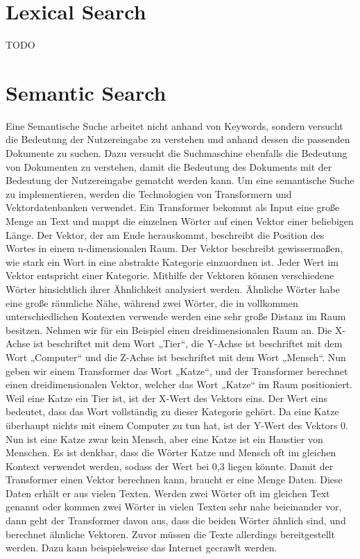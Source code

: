 \section{Lexical Search}
TODO

\section{Semantic Search}
Eine Semantische Suche arbeitet nicht anhand von Keywords, sondern versucht die Bedeutung der Nutzereingabe zu verstehen und anhand dessen die passenden Dokumente zu suchen. Dazu versucht die Suchmaschine ebenfalls die Bedeutung von Dokumenten zu verstehen, damit die Bedeutung des Dokuments mit der Bedeutung der Nutzereingabe gematcht werden kann.
Um eine semantische Suche zu implementieren, werden die Technologien von Transformern und Vektordatenbanken verwendet. Ein Transformer bekommt als Input eine große Menge an Text und mappt die einzelnen Wörter auf einen Vektor einer beliebigen Länge. Der Vektor, der am Ende herauskommt, beschreibt die Position des Wortes in einem n-dimensionalen Raum. Der Vektor beschreibt gewissermaßen, wie stark ein Wort in eine abstrakte Kategorie einzuordnen ist. Jeder Wert im Vektor entspricht einer Kategorie. Mithilfe der Vektoren können verschiedene Wörter hinsichtlich ihrer Ähnlichkeit analysiert werden. Ähnliche Wörter habe eine große räumliche Nähe, während zwei Wörter, die in vollkommen unterschiedlichen Kontexten verwende werden eine sehr große Distanz im Raum besitzen.
Nehmen wir für ein Beispiel einen dreidimensionalen Raum an. Die X-Achse ist beschriftet mit dem Wort „Tier“, die Y-Achse ist beschriftet mit dem Wort „Computer“ und die Z-Achse ist beschriftet mit dem Wort „Mensch“. Nun geben wir einem Transformer das Wort „Katze“, und der Transformer berechnet einen dreidimensionalen Vektor, welcher das Wort „Katze“ im Raum positioniert. Weil eine Katze ein Tier ist, ist der X-Wert des Vektors eins.  Der Wert eins bedeutet, dass das Wort vollständig zu dieser Kategorie gehört. Da eine Katze überhaupt nichts mit einem Computer zu tun hat, ist der Y-Wert des Vektors 0. Nun ist eine Katze zwar kein Mensch, aber eine Katze ist ein Haustier von Menschen. Es ist denkbar, dass die Wörter Katze und Mensch oft im gleichen Kontext verwendet werden, sodass der Wert bei 0,3 liegen könnte.
Damit der Transformer einen Vektor berechnen kann, braucht er eine Menge Daten. Diese Daten erhält er aus vielen Texten. Werden zwei Wörter oft im gleichen Text genannt oder kommen zwei Wörter in vielen Texten sehr nahe beieinander vor, dann geht der Transformer davon aus, dass die beiden Wörter ähnlich sind, und berechnet ähnliche Vektoren. Zuvor müssen die Texte allerdings bereitgestellt werden. Dazu kann beispielsweise das Internet gecrawlt werden.
